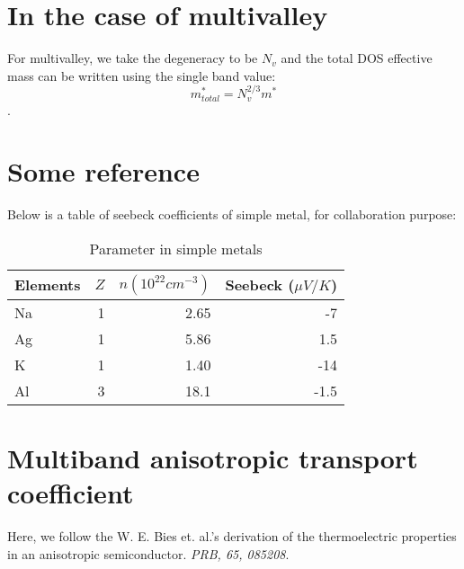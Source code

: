 \documentclass{article}
\begin{document}
\section{In the case of multivalley}
For multivalley, we take the degeneracy to be $N_v$ and the 
total DOS effective mass can be written using the single 
band value:
\begin{equation}
    m^*_{total} = N_v^{2/3}m^*
\end{equation}.

\section{Some reference}
Below is a table of seebeck coefficients of simple metal, for collaboration purpose:
\begin{table}[h]
    \caption{Parameter in simple metals}
    \centering
    \begin{tabular}{lrrr}
        \hline
        Elements & $Z$ & $n(10^{22} cm^{-3})$ & Seebeck ($\mu V/K$) \\ \hline
        Na       &  1  & 2.65                 & -7   \\
        Ag       &  1  & 5.86                 & 1.5  \\
        K        &  1  & 1.40                 & -14  \\
        Al       &  3  & 18.1                 & -1.5 \\ \hline
    \end{tabular}
\end{table}

\section{Multiband anisotropic transport coefficient}
Here, we follow the W. E. Bies et. al.'s derivation of the 
thermoelectric properties in an anisotropic semiconductor.
\emph{PRB, 65, 085208}. 
\end{document}
